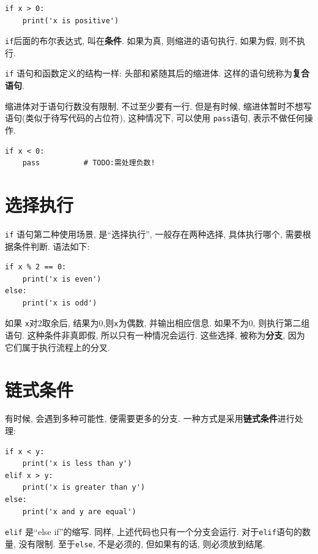 \documentclass[10pt]{book}
\begin{document}
\begin{verbatim}
if x > 0:
    print('x is positive')
\end{verbatim}
%
{\tt if}后面的布尔表达式, 叫在{\bf 条件}. 
如果为真, 则缩进的语句执行, 如果为假, 则不执行. 

{\tt if} 语句和函数定义的结构一样: 头部和紧随其后的缩进体. 
这样的语句统称为{\bf 复合语句}.

缩进体对于语句行数没有限制, 不过至少要有一行. 
但是有时候, 缩进体暂时不想写语句(类似于待写代码的占位符), 
这种情况下, 可以使用 {\tt pass}语句, 表示不做任何操作.

\begin{verbatim}
if x < 0:
    pass          # TODO:需处理负数!
\end{verbatim}
%

\section{选择执行}
\label{alternative.execution}
{\tt if} 语句第二种使用场景, 是``选择执行'',
一般存在两种选择, 具体执行哪个, 需要根据条件判断. 
语法如下:

\begin{verbatim}
if x % 2 == 0:
    print('x is even')
else:
    print('x is odd')
\end{verbatim}
%
如果 {\tt x}对2取余后, 结果为0,则{\tt x}为偶数, 并输出相应信息. 
如果不为0, 则执行第二组语句. 
这种条件非真即假, 所以只有一种情况会运行. 这些选择, 
被称为{\bf 分支}, 
因为它们属于执行流程上的分叉. 

\section{链式条件}
有时候, 会遇到多种可能性, 便需要更多的分支. 
一种方式是采用{\bf 链式条件}进行处理:

\begin{verbatim}
if x < y:
    print('x is less than y')
elif x > y:
    print('x is greater than y')
else:
    print('x and y are equal')
\end{verbatim}
%
{\tt elif} 是``else if''的缩写. 同样, 上述代码也只有一个分支会运行. 
对于{\tt elif}语句的数量, 没有限制. 
至于{\tt else}, 不是必须的, 但如果有的话, 则必须放到结尾.
\end{document}
